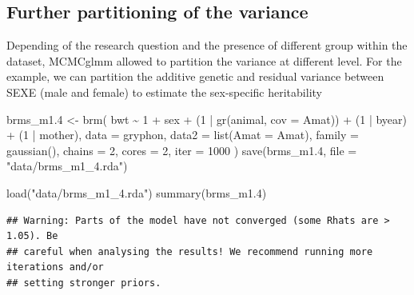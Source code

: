 \documentclass[
  12pt,
]{book}
\newenvironment{Shaded}{\begin{snugshade}}{\end{snugshade}}
\newcommand{\AttributeTok}[1]{\textcolor[rgb]{0.77,0.63,0.00}{#1}}
\newcommand{\DecValTok}[1]{\textcolor[rgb]{0.00,0.00,0.81}{#1}}
\newcommand{\FloatTok}[1]{\textcolor[rgb]{0.00,0.00,0.81}{#1}}
\newcommand{\FunctionTok}[1]{\textcolor[rgb]{0.00,0.00,0.00}{#1}}
\newcommand{\NormalTok}[1]{#1}
\newcommand{\OtherTok}[1]{\textcolor[rgb]{0.56,0.35,0.01}{#1}}
\newcommand{\SpecialCharTok}[1]{\textcolor[rgb]{0.00,0.00,0.00}{#1}}
\newcommand{\StringTok}[1]{\textcolor[rgb]{0.31,0.60,0.02}{#1}}
\begin{document}
\hypertarget{further-partitioning-of-the-variance}{%
\subsection{Further partitioning of the variance}\label{further-partitioning-of-the-variance}}

Depending of the research question and the presence of different group within the dataset, MCMCglmm allowed to partition the variance at different level. For the example, we can partition the additive genetic and residual variance between SEXE (male and female) to estimate the sex-specific heritability

\begin{Shaded}
\begin{Highlighting}[]
\NormalTok{brms\_m1}\FloatTok{.4} \OtherTok{\textless{}{-}} \FunctionTok{brm}\NormalTok{(}
\NormalTok{  bwt }\SpecialCharTok{\textasciitilde{}} \DecValTok{1} \SpecialCharTok{+}\NormalTok{ sex }\SpecialCharTok{+}\NormalTok{ (}\DecValTok{1} \SpecialCharTok{|} \FunctionTok{gr}\NormalTok{(animal, }\AttributeTok{cov =}\NormalTok{ Amat)) }\SpecialCharTok{+}\NormalTok{ (}\DecValTok{1} \SpecialCharTok{|}\NormalTok{ byear) }\SpecialCharTok{+}\NormalTok{ (}\DecValTok{1} \SpecialCharTok{|}\NormalTok{ mother),}
  \AttributeTok{data =}\NormalTok{ gryphon,}
  \AttributeTok{data2 =} \FunctionTok{list}\NormalTok{(}\AttributeTok{Amat =}\NormalTok{ Amat),}
  \AttributeTok{family =} \FunctionTok{gaussian}\NormalTok{(),}
  \AttributeTok{chains =} \DecValTok{2}\NormalTok{, }\AttributeTok{cores =} \DecValTok{2}\NormalTok{, }\AttributeTok{iter =} \DecValTok{1000}
\NormalTok{)}
\FunctionTok{save}\NormalTok{(brms\_m1}\FloatTok{.4}\NormalTok{, }\AttributeTok{file =} \StringTok{"data/brms\_m1\_4.rda"}\NormalTok{)}
\end{Highlighting}
\end{Shaded}

\begin{Shaded}
\begin{Highlighting}[]
\FunctionTok{load}\NormalTok{(}\StringTok{"data/brms\_m1\_4.rda"}\NormalTok{)}
\FunctionTok{summary}\NormalTok{(brms\_m1}\FloatTok{.4}\NormalTok{)}
\end{Highlighting}
\end{Shaded}

\begin{verbatim}
## Warning: Parts of the model have not converged (some Rhats are > 1.05). Be
## careful when analysing the results! We recommend running more iterations and/or
## setting stronger priors.
\end{verbatim}
\end{document}
